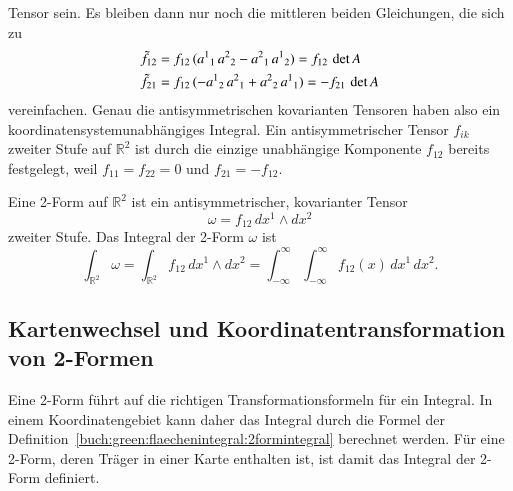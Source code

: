 Tensor sein.
Es bleiben dann nur noch die mittleren beiden Gleichungen,
die sich zu
\begin{align*}
\tilde{f}_{12}
&=
f_{12}\,(a^1\mathstrut_1\, a^2\mathstrut_2
-
a^2\mathstrut_1\, a^1\mathstrut_2)
=
f_{12}\,\det A
\\
\tilde{f}_{21}
&=
f_{12}\,(- a^1\mathstrut_2\, a^2\mathstrut_1
+
a^2\mathstrut_2\, a^1\mathstrut_1)
=
-f_{21}\,\det A
\end{align*}
vereinfachen.
Genau die antisymmetrischen kovarianten Tensoren haben also ein
koordinatensystemunabhängiges Integral.
Ein antisymmetrischer Tensor $f_{ik}$ zweiter Stufe auf $\mathbb{R}^2$
ist durch die einzige unabhängige Komponente $f_{12}$ bereits
festgelegt, weil $f_{11}=f_{22}=0$ und $f_{21}=-f_{12}$.

\begin{definition}
\label{buch:green:flaechenintegral:2formintegral}
Eine 2-Form auf $\mathbb{R}^2$ ist ein antisymmetrischer, kovarianter Tensor
%
\[
\omega
=
f_{12}\, dx^1\wedge dx^2
\]
zweiter Stufe.
Das Integral der 2-Form $\omega$ ist
\[
\int_{\mathbb{R}^2}
\omega
=
\int_{\mathbb{R}^2}
f_{12}\, dx^1\wedge dx^2
=
\int_{-\infty}^\infty
\int_{-\infty}^\infty
f_{12}(x)
\,
dx^1\,dx^2.
\]
\end{definition}

%
%
\subsection{Kartenwechsel und Koordinatentransformation von 2-Formen}
Eine 2-Form führt auf die richtigen Transformationsformeln für ein Integral.
In einem Koordinatengebiet kann daher das Integral durch die Formel
der Definition~\ref{buch:green:flaechenintegral:2formintegral}
berechnet werden.
Für eine 2-Form, deren Träger in einer Karte enthalten ist, ist
damit das Integral der 2-Form definiert.

